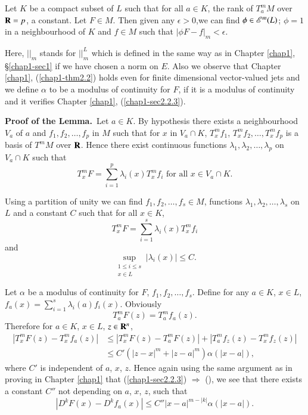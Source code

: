\begin{lemma}\label{chap2-lem1.4}
Let $K$ be a compact subset of $L$ such that for all $a\in K$, the rank of $T^{m}_{a}M$ over $\mathbf{R}=p$, a constant. Let $F\in M$. Then given any $\epsilon > 0$,\pageoriginale we can find $\phi\in \mathscr{E}^{m}(L)$; $\phi=1$ in a neighbourhood of $K$ and $f\in M$ such that $|\phi F-f|_{m}<\epsilon$.
\end{lemma}

Here, $||_{m}$ stands for $||^{L}_{m}$ which is defined in the same way as in Chapter \ref{chap1}, \S\ref{chap1-sec1} if we have chosen a norm on $E$. Also we observe that Chapter \ref{chap1}, (\ref{chap1-thm2.2}) holds even for finite dimensional vector-valued jets and we define $\alpha$ to be a modulus of continuity for $F$, if it is a modulus of continuity and it verifies Chapter \ref{chap1}, (\ref{chap1-sec2.2.3}).

\medskip
\noindent
{\bf Proof of the Lemma.}~Let $a\in K$. By hypothesis there exists a neighbourhood $V_{a}$ of $a$ and $f_{1},f_{2},\ldots,f_{p}$ in $M$ such that for $x$ in $V_{a}\cap K$, $T^{m}_{x}f_{1}$, $T^{m}_{x}f_{2},\ldots,T^{m}_{x}f_{p}$ is a basis of $T^{m}M$ over $\mathbf{R}$. Hence there exist continuous functions $\lambda_{1},\lambda_{2},\ldots,\lambda_{p}$ on $V_{a}\cap K$ such that
$$
T^{m}_{x}F=\sum\limits^{p}_{i=1}\lambda_{i}(x)T^{m}_{x}f_{i}\text{ for all } x\in V_{a}\cap K.
$$

Using a partition of unity we can find $f_{1}, f_{2},\ldots,f_{s}\in M$, functions $\lambda_{1},\lambda_{2},\ldots,\lambda_{s}$ on $L$ and a constant $C$ such that for all $x\in K$,
$$
T^{m}_{x}F=\sum\limits^{s}_{i=1}\lambda_{i}(x)T^{m}_{x}f_{i}
$$
and
$$
\sup\limits_{\substack{1\leq i\leq s\\ x\in L}}|\lambda_{i}(x)|\leq C.
$$

Let $\alpha$ be a modulus of continuity for $F$, $f_{1},f_{2},\ldots,f_{s}$. Define for any $a\in K$, $x\in L$, $f_{a}(x)=\sum\limits^{s}_{i=1}\lambda_{i}(a)f_{i}(x)$. Obviously
$$
T^{m}_{a}F(z)=T^{m}_{a}f_{a}(z).
$$
Therefore for $a\in K$, $x\in L$, $z\in \mathbf{R}^{n}$,
\begin{align*}
|T^{m}_{x}F(z)-T^{m}_{x}f_{a}(z)| &\leq |T^{m}_{x}F(z)-T^{m}_{a}F(z)|+|T^{m}_{a}f_{z}(z)-T^{m}_{x}f_{z}(z)|\\
& \leq C'(|z-x|^{m}+|z-a|^{m})\alpha (|x-a|),\tag{1.4.2}\label{chap2-eq1.4.2}
\end{align*}
where $C'$ is independent of $a$, $x$, $z$. Hence again using the same argument as in proving in Chapter \ref{chap1} that (\ref{chap1-sec2.2.3}) $\Rightarrow$ (\label{chap1-sec2.2.2}), we see that there exists a constant $C''$ not depending on $a$, $x$, $z$, such that
\begin{equation*}
|D^{k}F(x)-D^{k}f_{a}(x)|\leq C''|x-a|^{m-|k|}\alpha(|x-a|).\tag{1.4.2}\label{chap2-add-eq1.4.2}
\end{equation*}

